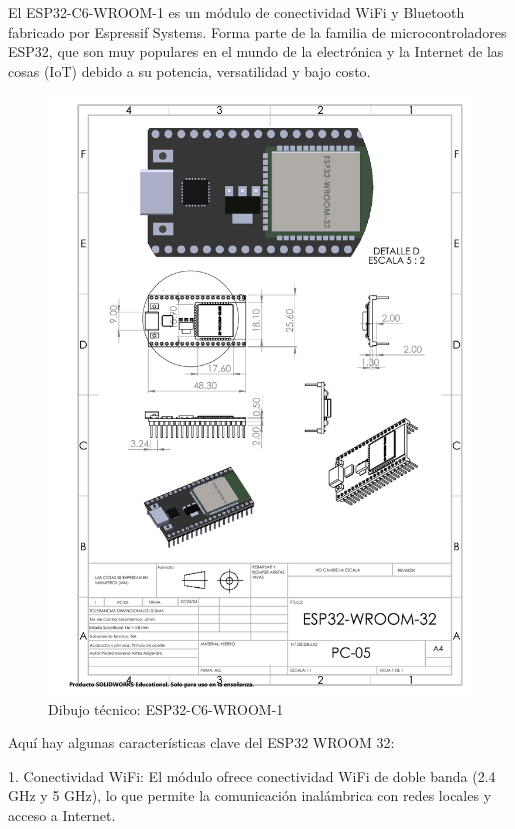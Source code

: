     El ESP32-C6-WROOM-1 es un módulo de conectividad WiFi y Bluetooth fabricado por Espressif Systems. Forma parte de la familia de microcontroladores ESP32, que son muy populares en el mundo de la electrónica y la Internet de las cosas (IoT) debido a su potencia, versatilidad y bajo costo.
    \begin{figure}[H]
        \centering
        \includegraphics[trim = {7mm 1mm 1mm 1mm},clip,scale=0.4]{22/Img/esp32Dibujo.pdf}
        \caption{Dibujo técnico: ESP32-C6-WROOM-1}
        \label{fig:esp}
    \end{figure}
    
    Aquí hay algunas características clave del ESP32 WROOM 32:
    
    1. Conectividad WiFi: El módulo ofrece conectividad WiFi de doble banda (2.4 GHz y 5 GHz), lo que permite la comunicación inalámbrica con redes locales y acceso a Internet.
    

